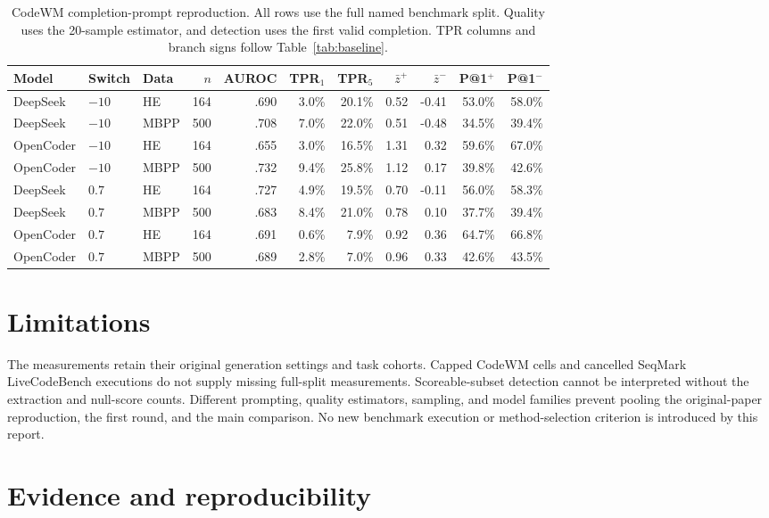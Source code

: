 \documentclass[11pt]{article}
\begin{document}
\small
\setlength{\tabcolsep}{4pt}
\begin{longtable}{lllrrrrrrrr}
\caption{CodeWM completion-prompt reproduction. All rows use the full named
benchmark split. Quality uses the 20-sample estimator, and detection uses
the first valid completion. TPR columns and branch signs follow
Table~\ref{tab:baseline}.}\label{tab:repro}\\
\toprule
Model & Switch & Data & $n$ & AUROC & TPR$_1$ & TPR$_5$ & $\bar z^+$ &
$\bar z^-$ & P@1$^+$ & P@1$^-$ \\
\midrule
DeepSeek & $-10$ & HE & 164 & .690 & 3.0\% & 20.1\% & 0.52 & -0.41 & 53.0\% & 58.0\% \\
DeepSeek & $-10$ & MBPP & 500 & .708 & 7.0\% & 22.0\% & 0.51 & -0.48 & 34.5\% & 39.4\% \\
OpenCoder & $-10$ & HE & 164 & .655 & 3.0\% & 16.5\% & 1.31 & 0.32 & 59.6\% & 67.0\% \\
OpenCoder & $-10$ & MBPP & 500 & .732 & 9.4\% & 25.8\% & 1.12 & 0.17 & 39.8\% & 42.6\% \\
DeepSeek & $0.7$ & HE & 164 & .727 & 4.9\% & 19.5\% & 0.70 & -0.11 & 56.0\% & 58.3\% \\
DeepSeek & $0.7$ & MBPP & 500 & .683 & 8.4\% & 21.0\% & 0.78 & 0.10 & 37.7\% & 39.4\% \\
OpenCoder & $0.7$ & HE & 164 & .691 & 0.6\% & 7.9\% & 0.92 & 0.36 & 64.7\% & 66.8\% \\
OpenCoder & $0.7$ & MBPP & 500 & .689 & 2.8\% & 7.0\% & 0.96 & 0.33 & 42.6\% & 43.5\% \\
\bottomrule
\end{longtable}
\normalsize

\section{Limitations}

The measurements retain their original generation settings and task cohorts.
Capped CodeWM cells and cancelled SeqMark LiveCodeBench executions do not
supply missing full-split measurements. Scoreable-subset detection cannot be
interpreted without the extraction and null-score counts. Different prompting,
quality estimators, sampling, and model families prevent pooling the
original-paper reproduction, the first round, and the main comparison.
No new benchmark execution or method-selection criterion is introduced by
this report.

\appendix
\section{Evidence and reproducibility}
\end{document}
